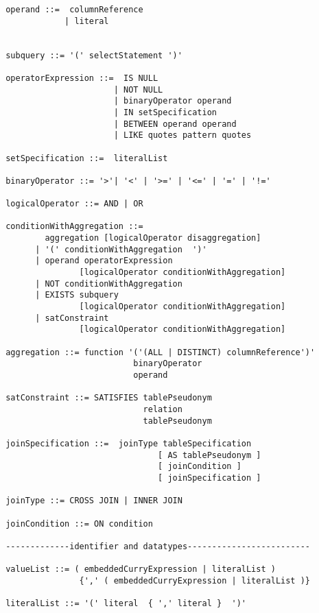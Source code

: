 \begin{lstlisting}
 operand ::=  columnReference 
             | literal           
             
             
 subquery ::= '(' selectStatement ')'            

 operatorExpression ::=  IS NULL                      
                       | NOT NULL                      
                       | binaryOperator operand        
                       | IN setSpecification           
                       | BETWEEN operand operand       
                       | LIKE quotes pattern quotes
  
 setSpecification ::=  literalList

 binaryOperator ::= '>'| '<' | '>=' | '<=' | '=' | '!='

 logicalOperator ::= AND | OR 

 conditionWithAggregation ::= 
         aggregation [logicalOperator disaggregation]                
       | '(' conditionWithAggregation  ')'                                     
       | operand operatorExpression 
                [logicalOperator conditionWithAggregation] 
       | NOT conditionWithAggregation                                          
       | EXISTS subquery 
                [logicalOperator conditionWithAggregation]                                                                   
       | satConstraint
                [logicalOperator conditionWithAggregation]

 aggregation ::= function '('(ALL | DISTINCT) columnReference')' 
                           binaryOperator 
                           operand

 satConstraint ::= SATISFIES tablePseudonym 
                             relation 
                             tablePseudonym

 joinSpecification ::=  joinType tableSpecification
                                [ AS tablePseudonym ] 
                                [ joinCondition ] 
                                [ joinSpecification ]

 joinType ::= CROSS JOIN | INNER JOIN

 joinCondition ::= ON condition                                        

 -------------identifier and datatypes-------------------------

 valueList ::= ( embeddedCurryExpression | literalList ) 
                {',' ( embeddedCurryExpression | literalList )} 
                
 literalList ::= '(' literal  { ',' literal }  ')'


\end{lstlisting}
